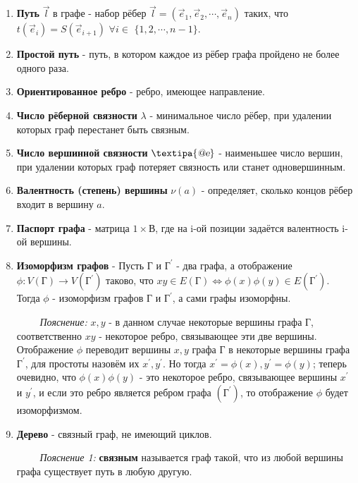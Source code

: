 \documentclass[a4paper,12pt]{article}
\begin{document}
\begin{enumerate}
            \item \textbf{Путь} $\overrightarrow l$ в графе - набор рёбер $\overrightarrow l = (\overrightarrow e_1, \overrightarrow e_2, \cdots, \overrightarrow e_n)$ таких, что $t(\overrightarrow e_i) = S(\overrightarrow e_{i+1})$  $\forall i \in$ $\{1, 2, \cdots, n - 1\}$.
            \item \textbf{Простой путь} - путь, в котором каждое из рёбер графа пройдено не более одного раза.
            \item \textbf{Ориентированное ребро} - ребро, имеющее направление.
            \item \textbf{Число рёберной связности} $\lambda$ - минимальное число рёбер, при удалении которых граф перестанет быть связным. 
            \item \textbf{Число вершинной связности} $\textipa{\textsl{@e}}$
            - наименьшее число вершин, при удалении которых граф потеряет связность или станет одновершинным.
            \item \textbf{Валентность (степень) вершины }$\nu(a)$ - определяет, сколько концов рёбер входит в вершину $a$. 
            \item \textbf{Паспорт графа} - матрица $1\times В$, где на i-ой позиции задаётся валентность i-ой вершины.
            \item \textbf{Изоморфизм графов} - Пусть $Г$ и $Г^\prime$ - два графа, а отображение $\phi : V(Г) \rightarrow V(Г^\prime)$ таково, что $x y \in E(Г) \Leftrightarrow \phi (x) \phi(y) \in E(Г^\prime)$. Тогда $\phi$ - изоморфизм графов $Г$ и $Г^\prime$, а сами графы изоморфны.
            
            $\qquad$ \textit{Пояснение:} $x,y$ - в данном случае некоторые вершины графа $Г$, соответственно $x y$ - некоторое ребро, связывающее эти две вершины. Отображение $\phi$ переводит вершины $x, y$ графа $Г$ в некоторые вершины графа $Г^\prime$, для простоты назовём их $x^\prime, y^\prime$. Но тогда $x^\prime = \phi (x), y^\prime = \phi(y)$; теперь очевидно, что $\phi (x) \phi(y)$  - это некоторое ребро, связывающее вершины $x^\prime$ и $y^\prime$, и если это ребро является ребром графа $(Г^\prime)$, то отображение $\phi$ будет изоморфизмом.
            
            \item \textbf{Дерево} - связный граф, не имеющий циклов.
            
            $\qquad$ \textit{Пояснение 1:} \textbf{связным} называется граф такой, что из любой вершины графа существует путь в любую другую.
            

\end{enumerate}
\end{document}

